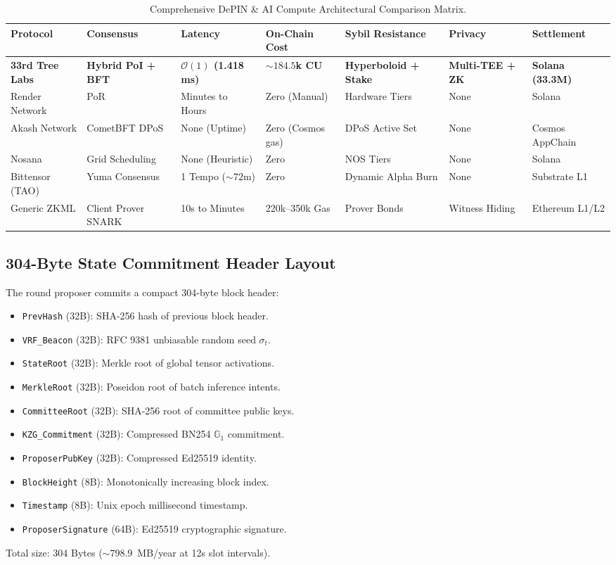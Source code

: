 \documentclass[10pt,twocolumn,letterpaper]{article}
\begin{document}
\begin{table}[t]
\centering
\small
\caption{Comprehensive DePIN \& AI Compute Architectural Comparison Matrix.}
\label{tab:comparison}
\begin{tabularx}{\textwidth}{lXllXXl}
\toprule
\textbf{Protocol} & \textbf{Consensus} & \textbf{Latency} & \textbf{On-Chain Cost} & \textbf{Sybil Resistance} & \textbf{Privacy} & \textbf{Settlement} \\
\midrule
\textbf{33rd Tree Labs} & \textbf{Hybrid PoI + BFT} & \textbf{$\mathcal{O}(1)$ (1.418 ms)} & \textbf{$\sim 184.5$k CU} & \textbf{Hyperboloid + Stake} & \textbf{Multi-TEE + ZK} & \textbf{Solana (33.3M)} \\
Render Network & PoR & Minutes to Hours & Zero (Manual) & Hardware Tiers & None & Solana \\
Akash Network & CometBFT DPoS & None (Uptime) & Zero (Cosmos gas) & DPoS Active Set & None & Cosmos AppChain \\
Nosana & Grid Scheduling & None (Heuristic) & Zero & NOS Tiers & None & Solana \\
Bittensor (TAO) & Yuma Consensus & 1 Tempo ($\sim 72$m) & Zero & Dynamic Alpha Burn & None & Substrate L1 \\
Generic ZKML & Client Prover SNARK & 10s to Minutes & 220k--350k Gas & Prover Bonds & Witness Hiding & Ethereum L1/L2 \\
\bottomrule
\end{tabularx}
\end{table}

\subsection{304-Byte State Commitment Header Layout}
The round proposer commits a compact 304-byte block header:
\begin{itemize}
    \item \texttt{PrevHash} (32B): SHA-256 hash of previous block header.
    \item \texttt{VRF\_Beacon} (32B): RFC 9381 unbiasable random seed $\sigma_t$.
    \item \texttt{StateRoot} (32B): Merkle root of global tensor activations.
    \item \texttt{MerkleRoot} (32B): Poseidon root of batch inference intents.
    \item \texttt{CommitteeRoot} (32B): SHA-256 root of committee public keys.
    \item \texttt{KZG\_Commitment} (32B): Compressed BN254 $\mathbb{G}_1$ commitment.
    \item \texttt{ProposerPubKey} (32B): Compressed Ed25519 identity.
    \item \texttt{BlockHeight} (8B): Monotonically increasing block index.
    \item \texttt{Timestamp} (8B): Unix epoch millisecond timestamp.
    \item \texttt{ProposerSignature} (64B): Ed25519 cryptographic signature.
\end{itemize}
Total size: 304 Bytes ($\sim 798.9$~MB/year at 12s slot intervals).
\end{document}
